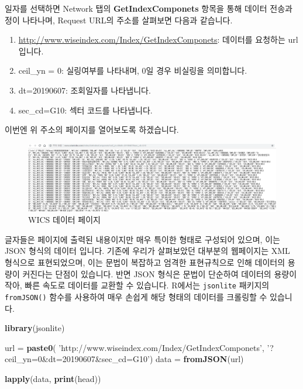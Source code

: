 \documentclass[12pt,]{book}
\newenvironment{Shaded}{\begin{snugshade}}{\end{snugshade}}
\newcommand{\KeywordTok}[1]{\textcolor[rgb]{0.13,0.29,0.53}{\textbf{#1}}}
\newcommand{\NormalTok}[1]{#1}
\newcommand{\StringTok}[1]{\textcolor[rgb]{0.31,0.60,0.02}{#1}}
\providecommand{\tightlist}{%
  \setlength{\itemsep}{0pt}\setlength{\parskip}{0pt}}
\begin{document}
일자를 선택하면 Network 탭의 \textbf{GetIndexComponets} 항목을 통해 데이터 전송과정이 나타나며, Request URL의 주소를 살펴보면 다음과 같습니다.

\begin{enumerate}
\def\labelenumi{\arabic{enumi}.}
\tightlist
\item
  \url{http://www.wiseindex.com/Index/GetIndexComponets}: 데이터를 요청하는 url 입니다.
\item
  ceil\_yn = 0: 실링여부를 나타내며, 0일 경우 비실링을 의미합니다.
\item
  dt=20190607: 조회일자를 나타냅니다.
\item
  sec\_cd=G10: 섹터 코드를 나타냅니다.
\end{enumerate}

이번엔 위 주소의 페이지를 열어보도록 하겠습니다.

\begin{figure}[h]

{\centering \includegraphics[width=1\linewidth]{images/crawl_practice_wics3} 

}

\caption{WICS 데이터 페이지}\label{fig:unnamed-chunk-26}
\end{figure}

글자들은 페이지에 출력된 내용이지만 매우 특이한 형태로 구성되어 있으며, 이는 JSON 형식의 데이터 입니다. 기존에 우리가 살펴보았던 대부분의 웹페이지는 XML 형식으로 표현되었으며, 이는 문법이 복잡하고 엄격한 표현규칙으로 인해 데이터의 용량이 커진다는 단점이 있습니다. 반면 JSON 형식은 문법이 단순하여 데이터의 용량이 작아, 빠른 속도로 데이터를 교환할 수 있습니다. R에서는 \texttt{jsonlite} 패키지의 \texttt{fromJSON()} 함수를 사용하여 매우 손쉽게 해당 형태의 데이터를 크롤링할 수 있습니다.

\begin{Shaded}
\begin{Highlighting}[]
\KeywordTok{library}\NormalTok{(jsonlite)}

\NormalTok{url =}\StringTok{ }\KeywordTok{paste0}\NormalTok{(}
  \StringTok{'http://www.wiseindex.com/Index/GetIndexComponets'}\NormalTok{,}
  \StringTok{'?ceil_yn=0&dt=20190607&sec_cd=G10'}\NormalTok{)}
\NormalTok{data =}\StringTok{ }\KeywordTok{fromJSON}\NormalTok{(url)}

\KeywordTok{lapply}\NormalTok{(data, }\KeywordTok{print}\NormalTok{(head))}
\end{Highlighting}
\end{Shaded}
\end{document}
